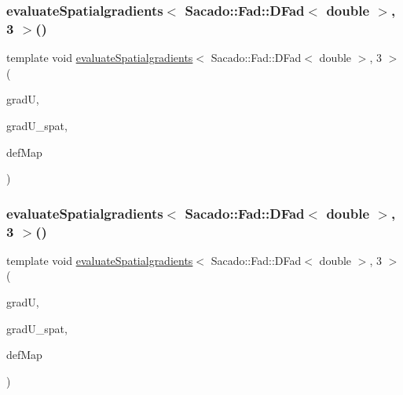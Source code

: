 \mbox{\label{function_evaluations_8cc_adc3a2ad656bc48d7a11c24f546ba43bd}} 
\subsubsection{\texorpdfstring{evaluateSpatialgradients$<$ Sacado::Fad::DFad$<$ double $>$, 3 $>$()}{evaluateSpatialgradients< Sacado::Fad::DFad< double >, 3 >()}\hspace{0.1cm}{\footnotesize\ttfamily [1/2]}}
{\footnotesize\ttfamily template void \mbox{\hyperlink{group___evaluation_functions_ga0b976342d491f6215953e2e65ea6a0de}{evaluate\+Spatialgradients}}$<$ Sacado\+::\+Fad\+::\+D\+Fad$<$ double $>$, 3 $>$ (\begin{DoxyParamCaption}\item[{Table$<$ 2, Sacado\+::\+Fad\+::\+D\+Fad$<$ double $>$$>$ \&}]{gradU,  }\item[{Table$<$ 2, Sacado\+::\+Fad\+::\+D\+Fad$<$ double $>$$>$}]{grad\+U\+\_\+spat,  }\item[{\mbox{\hyperlink{structdeformation_map}{deformation\+Map}}$<$ Sacado\+::\+Fad\+::\+D\+Fad$<$ double $>$, 3 $>$ \&}]{def\+Map }\end{DoxyParamCaption})}

\mbox{\label{function_evaluations_8cc_a343650e4cd1050b8776d2fec5dfc1804}} 
\subsubsection{\texorpdfstring{evaluateSpatialgradients$<$ Sacado::Fad::DFad$<$ double $>$, 3 $>$()}{evaluateSpatialgradients< Sacado::Fad::DFad< double >, 3 >()}\hspace{0.1cm}{\footnotesize\ttfamily [2/2]}}
{\footnotesize\ttfamily template void \mbox{\hyperlink{group___evaluation_functions_ga0b976342d491f6215953e2e65ea6a0de}{evaluate\+Spatialgradients}}$<$ Sacado\+::\+Fad\+::\+D\+Fad$<$ double $>$, 3 $>$ (\begin{DoxyParamCaption}\item[{Table$<$ 3, Sacado\+::\+Fad\+::\+D\+Fad$<$ double $>$$>$ \&}]{gradU,  }\item[{Table$<$ 3, Sacado\+::\+Fad\+::\+D\+Fad$<$ double $>$$>$}]{grad\+U\+\_\+spat,  }\item[{\mbox{\hyperlink{structdeformation_map}{deformation\+Map}}$<$ Sacado\+::\+Fad\+::\+D\+Fad$<$ double $>$, 3 $>$ \&}]{def\+Map }\end{DoxyParamCaption})}

